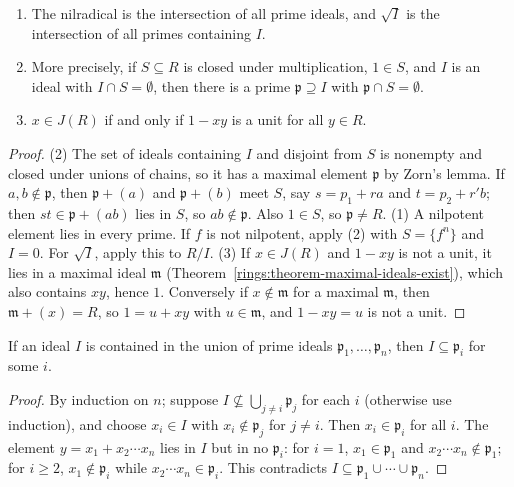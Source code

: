 \begin{proposition}\label{commutative-algebra:proposition-nilradical}
\begin{enumerate}
\item The nilradical is the intersection of all prime ideals, and $\sqrt I$ is the intersection of all primes
containing $I$.
\item More precisely, if $S \subseteq R$ is closed under multiplication, $1 \in S$, and $I$ is an ideal with
$I \cap S = \emptyset$, then there is a prime $\mathfrak{p} \supseteq I$ with $\mathfrak{p} \cap S = \emptyset$.
\item $x \in J(R)$ if and only if $1 - xy$ is a unit for all $y \in R$.
\end{enumerate}
\end{proposition}

\begin{proof}
(2) The set of ideals containing $I$ and disjoint from $S$ is nonempty and closed under unions of chains, so
it has a maximal element $\mathfrak{p}$ by Zorn's lemma. If $a, b \notin \mathfrak{p}$, then $\mathfrak{p} + (a)$ and
$\mathfrak{p} + (b)$ meet $S$, say $s = p_1 + ra$ and $t = p_2 + r'b$; then $st \in \mathfrak{p} + (ab)$ lies in $S$, so
$ab \notin \mathfrak{p}$. Also $1 \in S$, so $\mathfrak{p} \neq R$.
(1) A nilpotent element lies in every prime. If $f$ is not nilpotent, apply (2) with $S = \{f^n\}$ and $I = 0$. For
$\sqrt I$, apply this to $R/I$.
(3) If $x \in J(R)$ and $1 - xy$ is not a unit, it lies in a maximal ideal $\mathfrak{m}$
(Theorem~\ref{rings:theorem-maximal-ideals-exist}), which also contains $xy$, hence $1$. Conversely if
$x \notin \mathfrak{m}$ for a maximal $\mathfrak{m}$, then $\mathfrak{m} + (x) = R$, so $1 = u + xy$ with $u \in \mathfrak{m}$, and
$1 - xy = u$ is not a unit.
\end{proof}

\begin{lemma}\label{commutative-algebra:lemma-prime-avoidance}
If an ideal $I$ is contained in the union of prime ideals $\mathfrak{p}_1, \ldots, \mathfrak{p}_n$, then $I \subseteq \mathfrak{p}_i$ for
some $i$.
\end{lemma}

\begin{proof}
By induction on $n$; suppose $I \not\subseteq \bigcup_{j \neq i}\mathfrak{p}_j$ for each $i$ (otherwise use induction), and choose
$x_i \in I$ with $x_i \notin \mathfrak{p}_j$ for $j \neq i$. Then $x_i \in \mathfrak{p}_i$ for all $i$. The element
$y = x_1 + x_2 \cdots x_n$ lies in $I$ but in no $\mathfrak{p}_i$: for $i = 1$, $x_1 \in \mathfrak{p}_1$ and $x_2 \cdots x_n \notin \mathfrak{p}_1$; for
$i \geq 2$, $x_1 \notin \mathfrak{p}_i$ while $x_2 \cdots x_n \in \mathfrak{p}_i$. This contradicts
$I \subseteq \mathfrak{p}_1 \cup \cdots \cup \mathfrak{p}_n$.
\end{proof}

